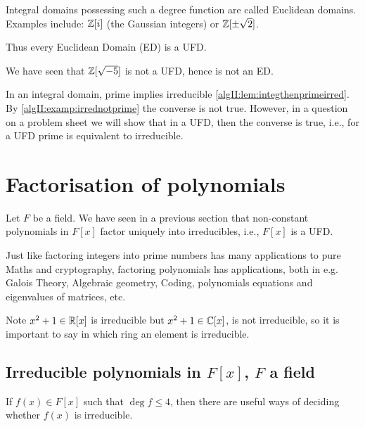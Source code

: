 \documentclass[10pt, a4paper]{article}
\begin{document}
Integral domains possessing such a degree function are called Euclidean domains.
Examples include:
$\mathbb{Z}[i]$
(the Gaussian integers)
or $\mathbb{Z}[\pm\sqrt{2}]$.

Thus every Euclidean Domain
(ED)
is a UFD.

We have seen that $\mathbb{Z}[\sqrt{-5}]$ is not a UFD,
hence is not an ED.

In an integral domain,
prime implies irreducible \autoref{algII:lem:integthenprimeirred}.
By \autoref{algII:examp:irrednotprime} the converse is not true.
However,
in a question on a problem sheet we will show that in a UFD,
then the converse is true,
i.e.,
for a UFD prime is equivalent to irreducible.

\newpage

\section{Factorisation of polynomials}
Let $F$ be a field.
We have seen in a previous section that non-constant polynomials in $F[x]$ factor uniquely into irreducibles,
i.e.,
$F[x]$ is a UFD.

Just like factoring integers into prime numbers has many applications to pure Maths and cryptography,
factoring polynomials has applications,
both in e.g.
Galois Theory,
Algebraic geometry,
Coding,
polynomials equations and eigenvalues of matrices,
etc.

Note $x ^ 2 + 1 \in \mathbb{R}[x]$ is irreducible but $x ^ 2 + 1 \in \mathbb{C}[x]$,
is not irreducible,
so it is important to say in which ring an element is irreducible.

\subsection{Irreducible polynomials in \texorpdfstring{$F[x]$}{},
\texorpdfstring{$F$}{} a field}
If $f(x) \in F[x]$ such that $\deg{f} \leq 4$,
then there are useful ways of deciding whether $f(x)$ is irreducible.
\end{document}
